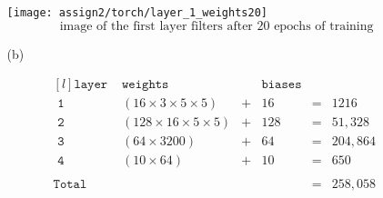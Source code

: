 \documentclass{article}
\begin{document}
\begin{itemize}
\begin{landscape}
\begin{itemize}
\begin{Verbatim}[fontsize=\small]
    \end{Verbatim}
	
	\begin{center}
	\texttt{[image: assign2/torch/layer\_1\_weights20]}
	$$\text{ image of the first layer filters after 20 epochs of training}$$
	\end{center}
	
	\item[(b)]
	
	\[
	\begin{matrix*}[l]
	\texttt{layer   } & \texttt{weights} & & \texttt{biases} & \\
	\texttt{ 1 } & (16 \times 3 \times 5 \times 5) & + & 16 & = & 1216\\
	\texttt{ 2 } & (128 \times 16 \times 5 \times 5) & + & 128 & = & 51,328\\
	\texttt{ 3 } & (64 \times 3200) & + & 64 & = & 204,864\\
	\texttt{ 4 } & (10 \times 64) & + & 10 & = & 650\\
	\\
	\texttt{Total   } & & & & = & 258,058	
	\end{matrix*}
	\]
	
	\end{itemize}
	
\end{landscape}

\end{itemize}
\end{document}
